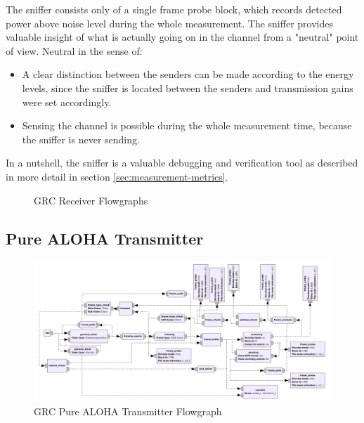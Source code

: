 The sniffer consists only of a single frame probe block, which records detected power above noise level during the whole measurement. The sniffer provides valuable insight of what is actually going on in the channel from a "neutral" point of view. Neutral in the sense of:

\begin{itemize}
	\item A clear distinction between the senders can be made according to the energy levels, since the sniffer is located between the senders and transmission gains were set accordingly.
	\item Sensing the channel is possible during the whole measurement time, because the sniffer is never sending.
\end{itemize}

In a nutshell, the sniffer is a valuable debugging and verification tool as described in more detail in section \ref{sec:measurement-metrics}.

\begin{figure}
	\label{fig:grc-receiver}
	\begin{center}
		\vskip 40pt
	\end{center}
	\caption{GRC Receiver Flowgraphs}
\end{figure}

\subsection{Pure ALOHA Transmitter}

\begin{figure}
	\label{fig:grc-aloha-sender}
	\begin{center}
		\includegraphics[width=\textwidth]{pictures/grc_aloha_transmitter_flowgraph}
\end{center}
\caption{GRC Pure ALOHA Transmitter Flowgraph}
\end{figure}

